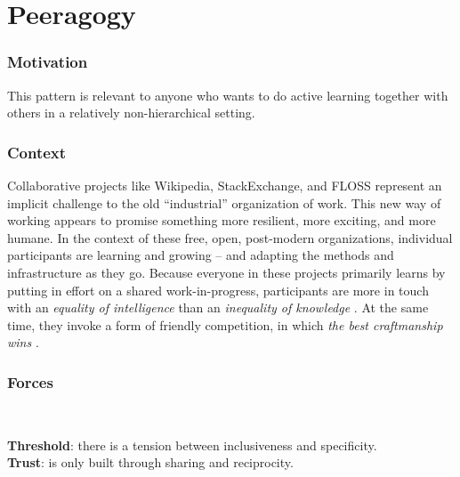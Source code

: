 \section{Peeragogy}\label{sec:Peeragogy} 

\subsubsection*{Motivation} This pattern is relevant to anyone who wants to do active learning together with others in a relatively non-hierarchical setting.

\subsubsection*{Context} Collaborative projects like Wikipedia, StackExchange, and FLOSS represent an implicit challenge to the old ``industrial'' organization of work.  This new way of working appears to promise something more resilient, more exciting, and more humane.  In the context of these free, open, post-modern organizations, individual participants are learning and growing -- and adapting the methods and infrastructure as they go.
Because everyone in these projects primarily learns by putting in effort on a shared work-in-progress, participants are more in touch with an \emph{equality of intelligence} than an \emph{inequality of knowledge} \cite[pp.~38,119]{ranciere1991ignorant}.
At the same time, they invoke a form of friendly competition, in which \emph{the best craftmanship wins} \cite[p.~89]{raymond2001cathedral}.

\subsubsection*{Forces}~
\parbox[t]{.85\textwidth}{
\textbf{Threshold}: there is a tension between inclusiveness and specificity.\\
\textbf{Trust}: is only built through sharing and reciprocity.
}

